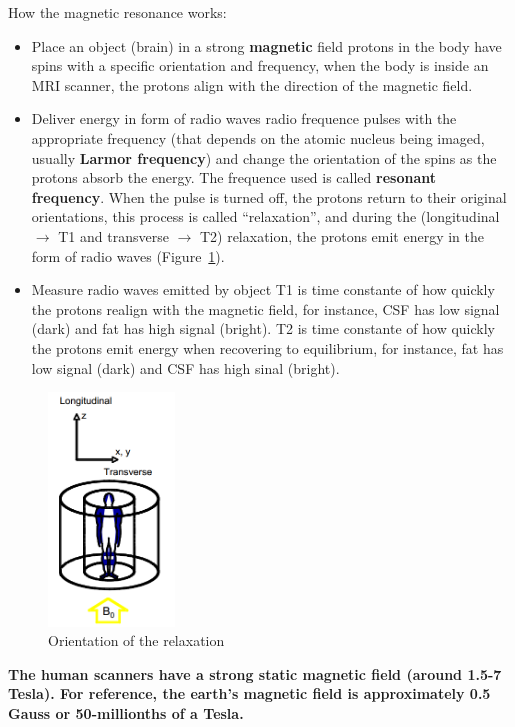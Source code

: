 \documentclass[12pt,article,oneside,a4paper]{memoir}
\begin{document}
How the magnetic resonance works:
\begin{itemize}
\item Place an object (brain) in a strong \textbf{magnetic} field
\subitem protons in the body have spins with a specific orientation and frequency, when
the body is inside an MRI scanner, the protons align with the direction of the magnetic
field.
\item Deliver energy in form of radio waves
\subitem radio frequence pulses with the appropriate frequency (that depends on the
atomic nucleus being imaged, usually \textbf{Larmor frequency}) and change the
orientation of the spins as the protons absorb the energy. The frequence used is called
\textbf{resonant frequency}. When the pulse is turned off, the protons return to their
original orientations, this process is called ``relaxation'', and during the
(longitudinal $\rightarrow$ T1 and transverse $\rightarrow$ T2) relaxation, the protons
emit energy in the form of radio waves (Figure~\ref{fig:orientation-relaxation}).
\item Measure radio waves emitted by object
\subitem T1 is time constante of how quickly the protons realign with the magnetic field,
for instance, CSF has low signal (dark) and fat has high signal (bright).
\subitem T2 is time constante of how quickly the protons emit energy when recovering to
equilibrium, for instance, fat has low signal (dark) and CSF has high sinal (bright).
\end{itemize}

\begin{figure}
  \centering
  \includegraphics[width=0.3\textwidth]{imgs/mri-longitudinal-transverse.png}
  \caption{Orientation of the relaxation}
  \label{fig:orientation-relaxation}
\end{figure}

\textbf{The human scanners have a strong static magnetic field (around 1.5-7 Tesla).
For reference, the earth's magnetic field is approximately 0.5 Gauss or 50-millionths of
a Tesla.}
\end{document}
